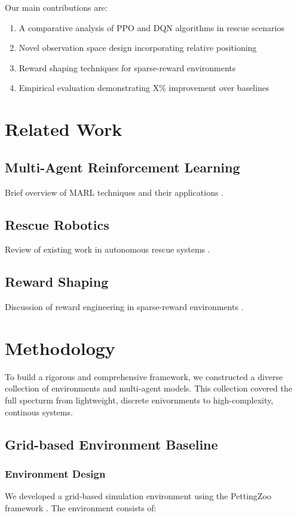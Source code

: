 \documentclass[conference]{IEEEtran}
\begin{document}
Our main contributions are:
\begin{enumerate}
    \item A comparative analysis of PPO and DQN algorithms in rescue scenarios
    \item Novel observation space design incorporating relative positioning
    \item Reward shaping techniques for sparse-reward environments
    \item Empirical evaluation demonstrating X\% improvement over baselines
\end{enumerate}

\section{Related Work}
\subsection{Multi-Agent Reinforcement Learning}
Brief overview of MARL techniques and their applications \cite{placeholder3}.

\subsection{Rescue Robotics}
Review of existing work in autonomous rescue systems \cite{placeholder4}.

\subsection{Reward Shaping}
Discussion of reward engineering in sparse-reward environments \cite{placeholder5}.

\section{Methodology}
To build a rigorous and comprehensive framework, we constructed a diverse collection of environments and multi-agent models. This collection covered the full specturm from lightweight, discrete enivornments to high-complexity, continous systems.

\subsection{Grid-based Environment Baseline}
\subsubsection{Environment Design}
We developed a grid-based simulation environment using the PettingZoo framework \cite{pettingzoo}. The environment consists of:
\end{document}
